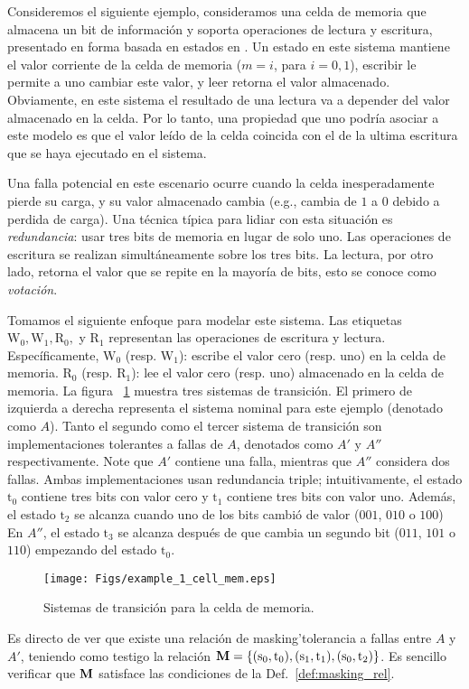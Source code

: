 	
\begin{example}
Consideremos el siguiente ejemplo, consideramos una celda de memoria que almacena un bit de información y soporta operaciones de lectura y escritura, presentado en forma basada en estados en \cite{DemasiCMA17}. Un estado en este sistema mantiene el valor corriente de la celda de memoria ($m=i$, para $i=0,1$), escribir le permite a uno cambiar este valor, y leer retorna el valor almacenado.  
Obviamente, en este sistema el resultado de una lectura va a depender del valor almacenado en la celda. 
Por lo tanto, una propiedad que uno podría asociar a este modelo es que el valor leído de la celda coincida con el de la ultima escritura que se haya ejecutado en el sistema.
    
Una falla potencial en este escenario ocurre cuando la celda inesperadamente pierde su carga, y su valor almacenado cambia (e.g., cambia de $1$ a $0$ debido a perdida de carga). Una técnica típica para lidiar con esta situación es \emph{redundancia}: usar tres bits de memoria en lugar de solo uno. Las operaciones de escritura se realizan simultáneamente sobre los tres bits. La lectura, por otro lado, retorna el valor que se repite en la mayoría de bits, esto se conoce como \emph{votación}. 

Tomamos el siguiente enfoque para modelar este sistema. Las etiquetas $\text{W}_0, \text{W}_1, \text{R}_0,$ y $\text{R}_1$
representan las operaciones de escritura y lectura. Específicamente, $\text{W}_0$ (resp. $\text{W}_1$): escribe el valor cero (resp. uno) en la celda de memoria. $\text{R}_0$ (resp. $\text{R}_1$): lee el valor cero (resp. uno) almacenado en la celda de memoria.
La figura ~\ref{figure:exam_1_mem_cell} muestra tres sistemas de transición. El primero de izquierda a derecha representa el sistema nominal para este ejemplo (denotado como $A$).
Tanto el segundo como el tercer sistema de transición son implementaciones tolerantes a fallas de $A$, denotados como $A'$ y $A''$ respectivamente. Note que $A'$ contiene una falla, mientras que $A''$ considera dos fallas. Ambas implementaciones usan redundancia triple; intuitivamente, el estado $\text{t}_0$ contiene tres bits con valor cero y $\text{t}_1$ contiene tres bits con valor uno.
Además, el estado $\text{t}_2$ se alcanza cuando uno de los bits cambió de valor ($001$, $010$ o $100$)
En  $A''$, el estado $\text{t}_3$ se alcanza después de que cambia un segundo bit ($011$, $101$ o $110$) empezando del estado $\text{t}_0$.
\begin{figure}[h] 
\begin{center}
    \texttt{[image: Figs/example\_1\_cell\_mem.eps]} 
    \caption{Sistemas de transición para la celda de memoria.}
    \label{figure:exam_1_mem_cell}
\end{center}
\end{figure}
\sloppy Es directo de ver que existe una relación de masking'tolerancia a fallas entre $A$ y $A'$, teniendo como testigo la relación $\mathbin{\mathbf{M}} = \{(\text{s}_0, \text{t}_0), (\text{s}_1, \text{t}_1), (\text{s}_0, \text{t}_2)\}$. Es sencillo verificar que $\mathbin{\mathbf{M}}$ satisface las condiciones de la Def.~\ref{def:masking_rel}.


\end{example}
